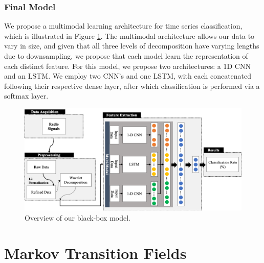 \documentclass{turabian-thesis}
\begin{document}
\subsection{Final Model}

We propose a multimodal learning architecture for time series classification, which is illustrated in Figure \ref{fig:multimodal_overview}. The multimodal architecture allows our data to vary in size, and given that all three levels of decomposition have varying lengths due to downsampling, we propose that each model learn the representation of each distinct feature. For this model, we propose two architectures: a 1D CNN and an LSTM. We employ two CNN’s and one LSTM, with each concatenated following their respective dense layer, after which classification is performed via a softmax layer. 

\begin{figure}[h!]
   \begin{center}
      \includegraphics[scale=0.65]{../media/multimodal_overview.png}
   \end{center}
   \caption{Overview of our black-box model.}
   \label{fig:multimodal_overview}
\end{figure}






 
\chapter{Markov Transition Fields}
\label{chap:mtf}
\end{document}
